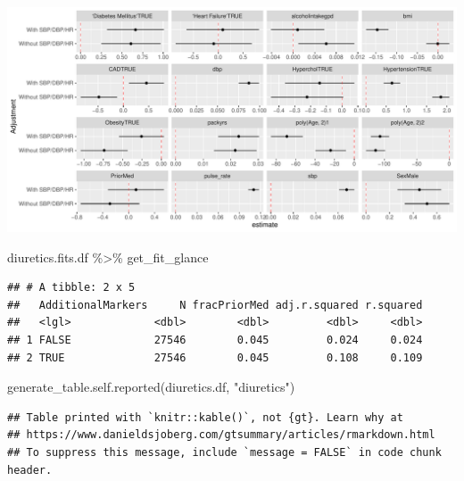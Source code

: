 \documentclass[
]{article}
\newenvironment{Shaded}{\begin{snugshade}}{\end{snugshade}}
\newcommand{\FunctionTok}[1]{\textcolor[rgb]{0.00,0.00,0.00}{#1}}
\newcommand{\NormalTok}[1]{#1}
\newcommand{\SpecialCharTok}[1]{\textcolor[rgb]{0.00,0.00,0.00}{#1}}
\newcommand{\StringTok}[1]{\textcolor[rgb]{0.31,0.60,0.02}{#1}}
\begin{document}
\includegraphics{../results/report_files/figure-latex/diuretics-fit-forest-1.pdf}

\begin{Shaded}
\begin{Highlighting}[]
\NormalTok{diuretics.fits.df }\SpecialCharTok{\%\textgreater{}\%} 
\NormalTok{  get\_fit\_glance}
\end{Highlighting}
\end{Shaded}

\begin{verbatim}
## # A tibble: 2 x 5
##   AdditionalMarkers     N fracPriorMed adj.r.squared r.squared
##   <lgl>             <dbl>        <dbl>         <dbl>     <dbl>
## 1 FALSE             27546        0.045         0.024     0.024
## 2 TRUE              27546        0.045         0.108     0.109
\end{verbatim}

\begin{Shaded}
\begin{Highlighting}[]
\FunctionTok{generate\_table.self.reported}\NormalTok{(diuretics.df, }\StringTok{"diuretics"}\NormalTok{)}
\end{Highlighting}
\end{Shaded}

\begin{verbatim}
## Table printed with `knitr::kable()`, not {gt}. Learn why at
## https://www.danieldsjoberg.com/gtsummary/articles/rmarkdown.html
## To suppress this message, include `message = FALSE` in code chunk header.
\end{verbatim}
\end{document}
